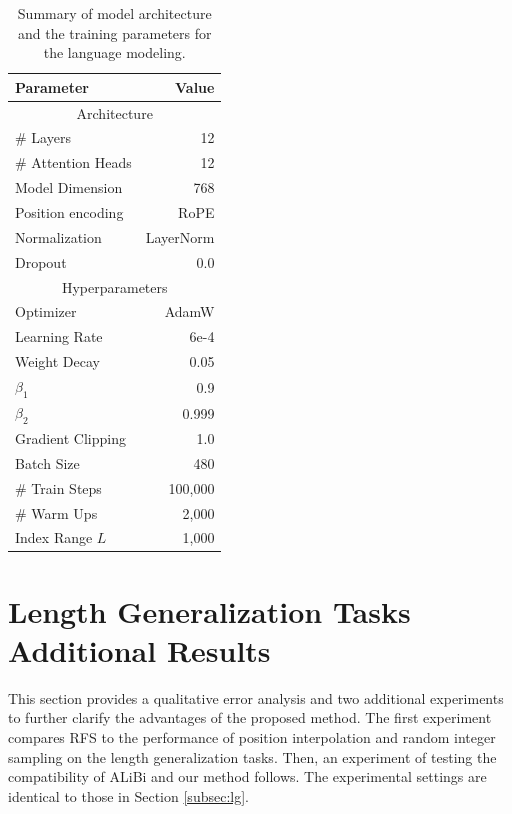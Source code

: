 \documentclass[11pt]{article}
\begin{document}
\begin{table}[h]
  \centering
  \begin{tabular}{lr}
    \toprule
    \textbf{Parameter} & \textbf{Value} \\
    \midrule\midrule
    \multicolumn{2}{c}{Architecture} \\
    \midrule
    \# Layers & 12 \\
    \# Attention Heads & 12 \\
    Model Dimension & 768 \\
    Position encoding & RoPE \\
    Normalization & LayerNorm \\
    Dropout & 0.0 \\
    \midrule
    \multicolumn{2}{c}{Hyperparameters} \\
    \midrule
    Optimizer & AdamW \\
    Learning Rate & 6e-4 \\
    Weight Decay & 0.05 \\
    $\beta_1$ & 0.9 \\
    $\beta_2$ & 0.999 \\
    Gradient Clipping & 1.0 \\
    Batch Size & 480 \\
    \# Train Steps & 100,000 \\
    \# Warm Ups & 2,000 \\
    Index Range $L$ & 1,000 \\
    \bottomrule
  \end{tabular}
  \caption{Summary of model architecture and the training parameters for the language modeling.}
  \label{tab:lm_params}
\end{table}

\section{Length Generalization Tasks Additional Results}\label{sec:lg_add_result}

This section provides a qualitative error analysis and two additional experiments to further clarify the advantages of the proposed method. The first experiment compares RFS to the performance of position interpolation and random integer sampling on the length generalization tasks. Then, an experiment of testing the compatibility of ALiBi and our method follows. The experimental settings are identical to those in Section \ref{subsec:lg}. 
\end{document}
